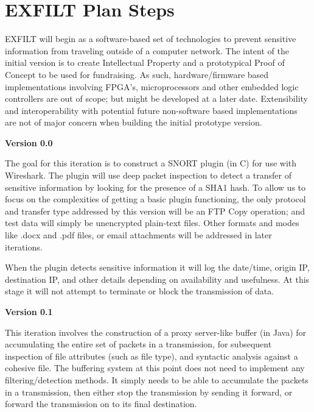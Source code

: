 \documentclass[dvipdfm]{book}
\begin{document}
\begin{titlepage}
{}
\vskip 0.1in
\center{\huge{\today}}
\end{titlepage}
\tableofcontents
\chapter{EXFILT Plan Steps}
EXFILT will begin as a software-based set of technologies to prevent
sensitive information from traveling outside of a computer network.
The intent of the initial version is to create Intellectual Property
and a prototypical Proof of Concept to be used for fundraising.  As
such, hardware/firmware based implementations involving FPGA’s,
microprocessors and other embedded logic controllers are out of scope;
but might be developed at a later date.  Extensibility and
interoperability with potential future non-software based
implementations are not of major concern when building the initial
prototype version.

\vspace{2mm}
\noindent
{\bf Version 0.0}

The goal for this iteration is to construct a SNORT plugin (in C) for
use with Wireshark.  The plugin will use deep packet inspection to
detect a transfer of sensitive information by looking for the presence
of a SHA1 hash.  To allow us to focus on the complexities of getting a
basic plugin functioning, the only protocol and transfer type
addressed by this version will be an FTP Copy operation; and test data
will simply be unencrypted plain-text files.  Other formats and modes
like .docx and .pdf files, or email attachments will be addressed in
later iterations.

When the plugin detects sensitive information it will log the
date/time, origin IP, destination IP, and other details depending on
availability and usefulness.  At this stage it will not attempt to
terminate or block the transmission of data.

\vspace{2mm}
\noindent
{\bf Version 0.1}

This iteration involves the construction of a proxy server-like buffer
(in Java) for accumulating the entire set of packets in a
transmission, for subsequent inspection of file attributes (such as
file type), and syntactic analysis against a cohesive file.  The
buffering system at this point does not need to implement any
filtering/detection methods.  It simply needs to be able to accumulate
the packets in a transmission, then either stop the transmission by
sending it forward, or forward the transmission on to its final
destination.
\end{document}
